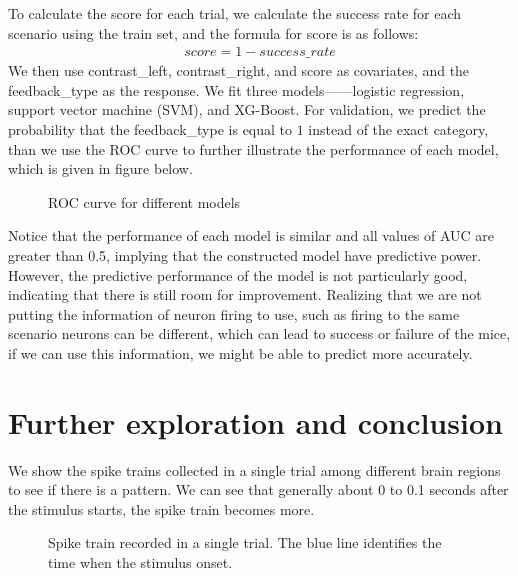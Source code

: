 \documentclass[12pt]{article}
\begin{document}
To calculate the score for each trial, we calculate the success rate for each scenario using the train set, and the formula for score is as follows:
\begin{align}
    score = 1-success\_rate\nonumber
\end{align}
We then use contrast\_left, contrast\_right, and score as covariates, and the feedback\_type as the response. We fit three models——logistic regression, support vector machine (SVM), and XG-Boost. For validation, we predict the probability that the feedback\_type is equal to $1$ instead of the exact category, than we use the ROC curve to further illustrate the performance of each model, which is given in figure below.
\begin{figure}[h]
  \centering
  \caption{ROC curve for different models}
  \label{fig:ROC}
\end{figure}

Notice that the performance of each model is similar and all values of AUC are greater than 0.5, implying that the constructed model have predictive power. However, the predictive performance of the model is not particularly good, indicating that there is still room for improvement. Realizing that we are not putting the information of neuron firing to use, such as firing to the same scenario neurons can be different, which can lead to success or failure of the mice, if we can use this information, we might be able to predict more accurately.


\section{Further exploration and conclusion}
We show the spike trains collected in a single trial among different brain regions to see if there is a pattern. We can see that generally about 0 to 0.1 seconds after the stimulus starts, the spike train becomes more.

\begin{figure}[h]
  \centering
  \caption{Spike train recorded in a single trial. The blue line identifies the time when the stimulus onset.}
\end{figure}
\end{document}
